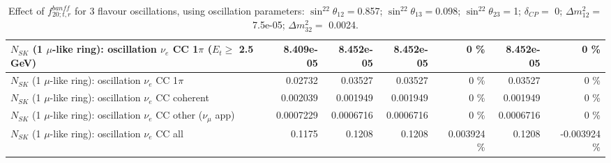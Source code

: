 \begin{table}
\begin{tabular}{| l | r | r | r  r | r  r |}
$N_{SK}$ (1 $\mu$-like ring): oscillation $\nu_e$ CC 1$\pi$ ($E_{t} \geq$ 2.5 GeV) &       8.409e-05 &       8.452e-05 &       8.452e-05 &        0 \%  &       8.452e-05 &        0 \%  \\ 
\hline
                     $N_{SK}$ (1 $\mu$-like ring): oscillation $\nu_e$ CC 1$\pi$ &         0.02732 &         0.03527 &         0.03527 &        0 \%  &         0.03527 &        0 \%  \\ 
                   $N_{SK}$ (1 $\mu$-like ring): oscillation $\nu_e$ CC coherent &        0.002039 &        0.001949 &        0.001949 &        0 \%  &        0.001949 &        0 \%  \\ 
      $N_{SK}$ (1 $\mu$-like ring): oscillation $\nu_e$ CC other ($\nu_\mu$ app) &       0.0007229 &       0.0006716 &       0.0006716 &        0 \%  &       0.0006716 &        0 \%  \\ 
                       $N_{SK}$ (1 $\mu$-like ring): oscillation $\nu_e$  CC all &          0.1175 &          0.1208 &          0.1208 & 0.003924 \%  &          0.1208 & -0.003924 \%  \\ 
\hline
\hline
\end{tabular}
\caption{ Effect of $f_{20; t, r}^{banff}$ for 3 flavour oscillations, using oscillation parameters:  $\sin^22\theta_{12} = $0.857; $\sin^22\theta_{13} = $0.098; $\sin^22\theta_{23} = $1; $\delta_{CP} = $        0; $\Delta m^2_{12} = $    7.5e-05; $\Delta m^2_{32} = $    0.0024. }
\label{tab:num_banff_ccqeE2_1RmuT_3f_osc_t13:0.098}
\end{table}
\clearpage
